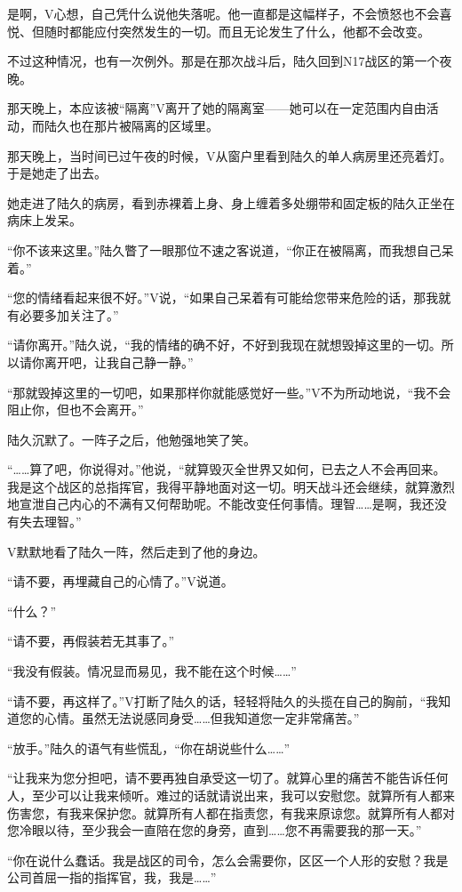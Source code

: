 是啊，V心想，自己凭什么说他失落呢。他一直都是这幅样子，不会愤怒也不会喜悦、但随时都能应付突然发生的一切。而且无论发生了什么，他都不会改变。

不过这种情况，也有一次例外。那是在那次战斗后，陆久回到N17战区的第一个夜晚。

那天晚上，本应该被“隔离”V离开了她的隔离室——她可以在一定范围内自由活动，而陆久也在那片被隔离的区域里。

那天晚上，当时间已过午夜的时候，V从窗户里看到陆久的单人病房里还亮着灯。于是她走了出去。

她走进了陆久的病房，看到赤裸着上身、身上缠着多处绷带和固定板的陆久正坐在病床上发呆。

“你不该来这里。”陆久瞥了一眼那位不速之客说道，“你正在被隔离，而我想自己呆着。”

“您的情绪看起来很不好。”V说，“如果自己呆着有可能给您带来危险的话，那我就有必要多加关注了。”

“请你离开。”陆久说，“我的情绪的确不好，不好到我现在就想毁掉这里的一切。所以请你离开吧，让我自己静一静。”

“那就毁掉这里的一切吧，如果那样你就能感觉好一些。”V不为所动地说，“我不会阻止你，但也不会离开。”

陆久沉默了。一阵子之后，他勉强地笑了笑。

“……算了吧，你说得对。”他说，“就算毁灭全世界又如何，已去之人不会再回来。我是这个战区的总指挥官，我得平静地面对这一切。明天战斗还会继续，就算激烈地宣泄自己内心的不满有又何帮助呢。不能改变任何事情。理智……是啊，我还没有失去理智。”

V默默地看了陆久一阵，然后走到了他的身边。

“请不要，再埋藏自己的心情了。”V说道。

“什么？”

“请不要，再假装若无其事了。”

“我没有假装。情况显而易见，我不能在这个时候……”

“请不要，再这样了。”V打断了陆久的话，轻轻将陆久的头揽在自己的胸前，“我知道您的心情。虽然无法说感同身受……但我知道您一定非常痛苦。”

“放手。”陆久的语气有些慌乱，“你在胡说些什么……”

“让我来为您分担吧，请不要再独自承受这一切了。就算心里的痛苦不能告诉任何人，至少可以让我来倾听。难过的话就请说出来，我可以安慰您。就算所有人都来伤害您，有我来保护您。就算所有人都在指责您，有我来原谅您。就算所有人都对您冷眼以待，至少我会一直陪在您的身旁，直到……您不再需要我的那一天。”

“你在说什么蠢话。我是战区的司令，怎么会需要你，区区一个人形的安慰？我是公司首屈一指的指挥官，我，我是……”

